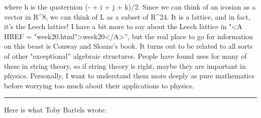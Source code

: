 where h is the quaternion (- + i + j + k)/2.  Since we can
think of an icosian as a vector in R^{8}, we can think of L as
a subset of R^{24}.  It is a lattice, and in fact, it's the
Leech lattice!  I have a bit more to say about the Leech lattice in
"<A HREF = "week20.html">week20</A>'', but the real place to go for
information on this beast is Conway and Sloane's book.  It turns out
to be related to all sorts of other "exceptional'' algebraic
structures.  People have found uses for many of these in string
theory, so if string theory is right, maybe they are important in
physics.  Personally, I want to understand them more deeply as pure
mathematics before worrying too much about their applications to
physics.

\par\noindent\rule{\textwidth}{0.4pt}
Here is what Toby Bartels wrote:

